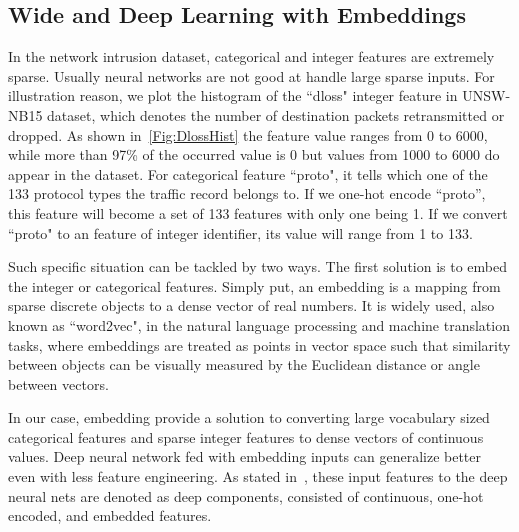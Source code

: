 \subsection{Wide and Deep Learning with Embeddings}
\label{SubSec:WD}
In the network intrusion dataset, categorical and integer features are extremely sparse.
Usually neural networks are not good at handle large sparse inputs.
For illustration reason, we plot the histogram of the ``dloss" integer feature in UNSW-NB15 dataset,
which denotes the number of destination packets retransmitted or dropped.
As shown in~\ref{Fig:DlossHist} the feature value ranges from 0 to 6000, while more than 97\%
of the occurred value is 0 but values from 1000 to 6000 do appear in the dataset.
For categorical feature ``proto", it tells which one of the 133 protocol types the traffic record belongs to.
If we one-hot encode ``proto'', this feature will become a set of 133 features with only one being 1.
If we convert ``proto" to an feature of integer identifier, its value will range from 1 to 133.

Such specific situation can be tackled by two ways.
The first solution is to embed the integer or categorical features. %
Simply put, an embedding is a mapping from sparse discrete objects to a dense vector of real numbers.
It is widely used, also known as ``word2vec", in the natural language processing and machine translation tasks,
where embeddings are treated as points in vector space such that similarity between objects can be visually measured
by the Euclidean distance or angle between vectors.

In our case, embedding provide a solution to converting large vocabulary sized categorical features
and sparse integer features to dense vectors of continuous values.
Deep neural network fed with embedding inputs can generalize better even with less feature engineering.
As stated in~\cite{WideDeepModel}, these input features to the deep neural nets are denoted as deep components,
consisted of continuous, one-hot encoded, and embedded features.


